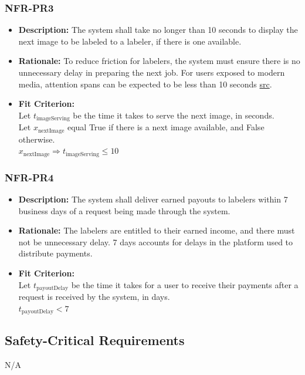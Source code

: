 \documentclass[12pt]{article}
\begin{document}
\subsubsection*{NFR-PR3}
\begin{itemize}
  \item \textbf{Description:} The system shall take no longer than 10 seconds to display the next image to be labeled to a labeler, if there is one available.
  \item \textbf{Rationale:} To reduce friction for labelers, the system must ensure there is no unnecessary delay in preparing the next job. For users exposed to modern media, attention spans can be expected to be less than 10 seconds \href{https://profiletree.com/attention-span-crisis-digital-age-statistics/#:~:text=Studies%20have%20proven%20that%20being,focus%20after%208%20mere%20seconds}{src}.
  \item \textbf{Fit Criterion:}\\ Let $t_{\text{imageServing}}$ be the time it takes to serve the next image, in seconds.\\
  Let $x_{\text{nextImage}}$ equal True if there is a next image available, and False otherwise.\\
  $x_{\text{nextImage}} \Rightarrow t_{\text{imageServing}} \leq 10$
\end{itemize}

\subsubsection*{NFR-PR4}
\begin{itemize}
  \item \textbf{Description:} The system shall deliver earned payouts to labelers within 7 business days of a request being made through the system.
  \item \textbf{Rationale:} The labelers are entitled to their earned income, and there must not be unnecessary delay. 7 days accounts for delays in the platform used to distribute payments.
  \item \textbf{Fit Criterion:}\\ Let $t_{\text{payoutDelay}}$ be the time it takes for a user to receive their payments after a request is received by the system, in days.\\
  $t_{\text{payoutDelay}} < 7$
\end{itemize}
\subsection{Safety-Critical Requirements}
N/A
\end{document}
